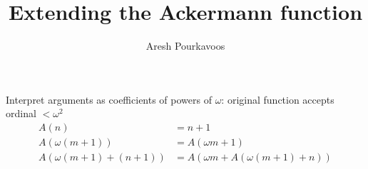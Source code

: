 \documentclass{article}
\begin{document}
\title{Extending the Ackermann function}
\author{Aresh Pourkavoos}
\maketitle

Interpret arguments as coefficients of powers of $\omega$:
original function accepts ordinal $<\omega^2$
\begin{align*}
A(n) &= n+1 \\
A(\omega(m+1)) &= A(\omega m+1) \\
A(\omega(m+1)+(n+1)) &= A(\omega m+A(\omega(m+1)+n)) \\
\end{align*}

\end{document}
